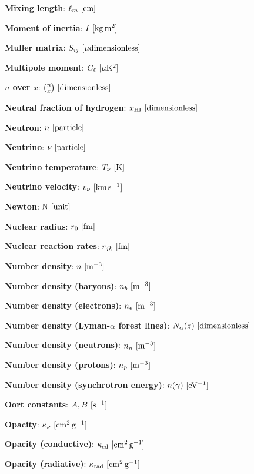 \documentclass[a4paper,10pt]{article}
\begin{document}
{\noindent}\textbf{Mixing length}: $\ell_m ~ [{\rm cm}]$

{\noindent}\textbf{Moment of inertia}: $I ~ [{\rm kg\,m^2}]$

{\noindent}\textbf{Muller matrix}: $S_{ij} ~ [{\rm \mu dimensionless}]$

{\noindent}\textbf{Multipole moment}: $C_\ell ~ [{\rm \mu K^2}]$

{\noindent}\textbf{$n$ over $x$}: $\binom{n}{x} ~ [{\rm dimensionless}]$

{\noindent}\textbf{Neutral fraction of hydrogen}: $x_\mathrm{HI} ~ [{\rm dimensionless}]$

{\noindent}\textbf{Neutron}: $n ~ [{\rm particle}]$

{\noindent}\textbf{Neutrino}: $\nu ~ [{\rm particle}]$

{\noindent}\textbf{Neutrino temperature}: $T_\nu ~ [{\rm K}]$

{\noindent}\textbf{Neutrino velocity}: $v_\nu ~ [{\rm km\,s^{-1}}]$

{\noindent}\textbf{Newton}: ${\rm N} ~ [{\rm unit}]$

{\noindent}\textbf{Nuclear radius}: $r_0 ~ [{\rm fm}]$

{\noindent}\textbf{Nuclear reaction rates}: $r_{jk} ~ [{\rm fm}]$

{\noindent}\textbf{Number density}: $n ~ [{\rm m^{-3}}]$

{\noindent}\textbf{Number density (baryons)}: $n_b ~ [{\rm m^{-3}}]$

{\noindent}\textbf{Number density (electrons)}: $n_e ~ [{\rm m^{-3}}]$

{\noindent}\textbf{Number density (Lyman-$\alpha$ forest lines)}: $N_\alpha(z) ~ [{\rm dimensionless}]$

{\noindent}\textbf{Number density (neutrons)}: $n_n ~ [{\rm m^{-3}}]$

{\noindent}\textbf{Number density (protons)}: $n_p ~ [{\rm m^{-3}}]$

{\noindent}\textbf{Number density (synchrotron energy)}: $n(\gamma) ~ [{\rm eV^{-1}}]$

{\noindent}\textbf{Oort constants}: $A,B ~ [{\rm s^{-1}}]$

{\noindent}\textbf{Opacity}: $\kappa_\nu ~ [{\rm cm^2\,g^{-1}}]$

{\noindent}\textbf{Opacity (conductive)}: $\kappa_{\rm cd} ~ [{\rm cm^2\,g^{-1}}]$

{\noindent}\textbf{Opacity (radiative)}: $\kappa_{\rm rad} ~ [{\rm cm^2\,g^{-1}}]$
\end{document}
